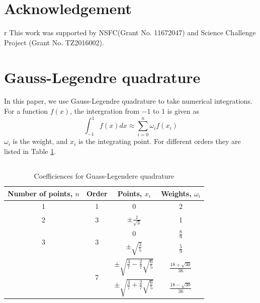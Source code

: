 \documentclass{article}
\numberwithin{equation}{section}
\numberwithin{table}{section}
\begin{document}
\section*{Acknowledgement}r
This work was supported by NSFC(Grant No. 11672047) and Science Challenge Project (Grant No. TZ2016002).


  \appendix
  \renewcommand{\appendixname}{Appendix~}

  \section{Gauss-Legendre  quadrature}
  In this paper, we use Gauss-Legendre quadrature to  take  numerical integrations. 
For a function $f(x)$,  the intergration from $-1$ to $1$ is given as
$$ 
  \int_{-1}^1 f(x)dx \approx \sum_{i=0}^n \omega_i f(x_i)
$$
$\omega_i$ is the weight, and $x_i$ is the integrating point.
For different orders they are listed in Table \ref{tab:coe}. 

\subsection{}
\begin{table}\label{tab:coe}
  \centering
  \caption{Coefficiences for Guass-Legendere quadrature}
  \begin{tabular}{cccc}
	\toprule
	Number of points, $n$ &  Order & Points, $x_i$ & Weights, $\omega_i$ \\
	\midrule
	1 & 1  & 0 & 2 \\
	\hline
	2 & 3  & $\pm \frac{1}{\sqrt{3}}$ & 1 \\
	\hline
	\multirow{2}{*}{3} &\multirow{2}{*}{3} & 0  & $\frac{8}{9}$ \\
	\cline{3-4}
	& & $\pm\sqrt{\frac{3}{5}}$ & $\frac{5}{9} $\\
	\hline
	\multirow{2}{*}{\makecell{4}} & \multirow{2}{*}{7}  & $\pm \sqrt{\frac{3}{7} -\frac{2}{7}\sqrt{\frac{6}{5}}}$  & $\frac{18+\sqrt{30}}{36}$ \\
	\cline{3-4}
  &  &  $\pm \sqrt{\frac{3}{7} +\frac{2}{7}\sqrt{\frac{6}{5}}}$  & $\frac{18-\sqrt{30}}{36}$ \\
  \bottomrule
\end{tabular}
\end{table}
\end{document}
